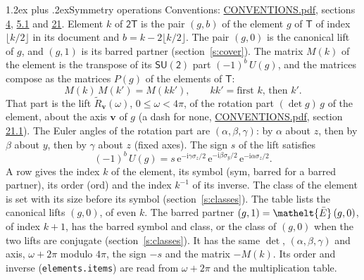 \documentclass[10pt,a4paper]{article}
\makeatletter
\renewcommand\section{\@startsection{section}{1}{\z@}{-3ex plus -1ex minus -.2ex}%
  {1.2ex plus .2ex}{\normalfont\large\sffamily\bfseries\color{parttitle}}}
\numberwithin{equation}{section}
\newcommand{\eltfont}[1]{{\let\sigma\eltsigma\mathelt{#1}}}
\newcommand{\grp}[1]{\mathsf{#1}}
\newcommand{\elt}[1]{\eltfont{#1}}
\newcommand{\vv}{\mathbf{v}}
\newcommand{\iunit}{\mathrm{i}}
\newcommand{\expe}{\mathrm{e}}
\newcommand{\barred}[1]{\bar{#1}}
\newcommand{\lift}[1]{\tilde{#1}}
\newcommand{\pauli}[1]{\sigma_{#1}}
\makeatother
\begin{document}
\section{Symmetry operations}\label{s:elements}
Conventions: \href{../../CONVENTIONS.pdf}{CONVENTIONS.pdf}, sections \href{../../../rotation/CONVENTIONS.pdf\#conv.4}{4}, \href{../../../rotation/CONVENTIONS.pdf\#conv.5.1}{5.1} and \href{../../CONVENTIONS.pdf\#conv.21}{21}.
\leavevmode\label{n:index.element}\label{n:element.g}Element $k$ of $\grp{2T}$ is the pair $(g, b)$ of the element $g$ of \href{../../../rotation/data/pdf/T.pdf}{$\grp{T}$} of index $\lfloor k/2\rfloor$ in its document and $b = k - 2\lfloor k/2\rfloor$. The pair $(g, 0)$ is the canonical lift of $g$, and $(g, 1)$ is its barred partner (section~\ref{s:cover}). \label{n:matrix.element.pin}\label{n:matrix.element}The matrix $M(k)$ of the element is the transpose of its $\grp{SU(2)}$ part $(-1)^{b}\,U(g)$, and the matrices compose as the matrices $P(g)$ of the elements of $\grp{T}$:
\begin{equation}\label{e:mprod}M(k)\,M(k') = M(kk'),\qquad kk' = \text{first } k\text{, then } k'.\end{equation}
\leavevmode\label{n:angle.omega}\label{n:vector.axis}\label{n:vector.pole}That part is the lift $\lift{R}_{\vv}(\omega)$, $0 \le \omega < 4\pi$, of the rotation part $(\det g)\,g$ of the element, about the axis $\vv$ of $g$ (a dash for none, \href{../../CONVENTIONS.pdf}{CONVENTIONS.pdf}, section \href{../../CONVENTIONS.pdf\#conv.21.1}{21.1}). \label{n:angle.euler.alpha}\label{n:angle.euler.beta}\label{n:angle.euler.gamma}\label{n:vector.coordinates}The Euler angles of the rotation part are $(\alpha,\beta,\gamma)$: by $\alpha$ about $z$, then by $\beta$ about $y$, then by $\gamma$ about $z$ (fixed axes). \label{n:local.euler.sign}The sign $s$ of the lift satisfies
\begin{equation}\label{e:euler}(-1)^{b}\,U(g) = s\,\expe^{-\iunit\gamma\pauli{z}/2}\,\expe^{-\iunit\beta\pauli{y}/2}\,\expe^{-\iunit\alpha\pauli{z}/2}.\end{equation}
\leavevmode\label{n:index.element.inverse}\label{n:head.sym}\label{n:head.ord}A row gives the index $k$ of the element, its symbol (sym, barred for a barred partner), its order (ord) and the index $k^{-1}$ of its inverse. \label{n:head.class}The class of the element is set with its size before its symbol (section~\ref{s:classes}).
The table lists the canonical lifts $(g, 0)$, of even $k$. The barred partner $(g, 1) = \elt{\barred{E}}\,(g, 0)$, of index $k + 1$, has the barred symbol and class, or the class of $(g, 0)$ when the two lifts are conjugate (section~\ref{s:classes}). It has the same $\det$, $(\alpha,\beta,\gamma)$ and axis, $\omega + 2\pi$ modulo $4\pi$, the sign $-s$ and the matrix $-M(k)$. Its order and inverse (\texttt{elements.items}) are read from $\omega + 2\pi$ and the multiplication table.
\end{document}

